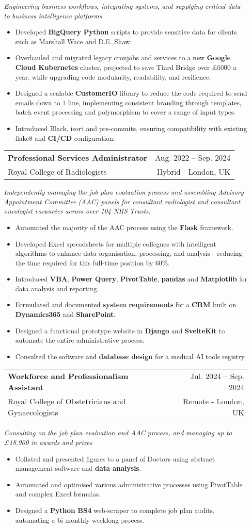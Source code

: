 \documentclass[letterpaper,11pt]{article}
\makeatletter
\newcommand{\resumeItem}[1]{
  \item\small{
    {#1 \vspace{-2pt}}
  }
}
\newcommand{\resumeSubtitle}[1]{
  \vspace{5pt}
  \small{
      \textit{#1 \vspace{-7pt}}
  }
}
\newcommand{\resumeSubheading}[4]{
  \vspace{-2pt}\item
    \begin{tabular*}{0.97\textwidth}[t]{l@{\extracolsep{\fill}}r}
      \textbf{#1} & #2 \\
      {\small#3} & {\small #4} \\
    \end{tabular*}\vspace{-7pt}
}
\newcommand{\resumeItemListStart}{\begin{itemize}}
\newcommand{\resumeItemListEnd}{\end{itemize}\vspace{-5pt}}
\makeatother
\begin{document}
      \resumeSubtitle{Engineering business workflows, integrating systems, and supplying critical data to business intelligence platforms}
      \resumeItemListStart
\resumeItem{Developed \textbf{BigQuery Python} scripts to provide sensitive data for clients such as Marshall Wace and D.E. Shaw.}
\resumeItem{Overhauled and migrated legacy cronjobs and services to a new \textbf{Google Cloud Kubernetes} cluster, projected to save Third Bridge over £6000 a year, while upgrading code modularity, readability, and resilience.}
\resumeItem{Designed a scalable \textbf{CustomerIO} library to reduce the code required to send emails down to 1 line, implementing consistent branding through templates, batch event processing and polymorphism to cover a range of input types.}
\resumeItem{Introduced Black, isort and pre-commits, ensuring compatibility with existing flake8 and \textbf{CI/CD} configuration.}
      \resumeItemListEnd
  
    \resumeSubheading
      {Professional Services Administrator}{Aug. 2022 -- Sep. 2024}
      {Royal College of Radiologists}{Hybrid - London, UK}
      
      \resumeSubtitle{Independently managing the job plan evaluation process and assembling Advisory Appointment Committee (AAC) panels for consultant radiologist and consultant oncologist vacancies across over 104 NHS Trusts.}
      \resumeItemListStart
\resumeItem{Automated the majority of the AAC process using the \textbf{Flask} framework.}
\resumeItem{Developed Excel spreadsheets for multiple collegues with intelligent algorithms to enhance data organisation, processing, and analysis - reducing the time required for this full-time position by 60\%.}
\resumeItem{Introduced \textbf{VBA}, \textbf{Power Query}, \textbf{PivotTable}, \textbf{pandas} and \textbf{Matplotlib} for data analysis and reporting.}
\resumeItem{Formulated and documented \textbf{system requirements} for a \textbf{CRM} built on \textbf{Dynamics365} and \textbf{SharePoint}.}
\resumeItem{Designed a functional prototype website in \textbf{Django} and \textbf{SvelteKit} to automate the entire administrative process.}
\resumeItem{Consulted the software and \textbf{database design} for a medical AI tools registry.}
      \resumeItemListEnd
      

    \resumeSubheading
      {Workforce and Professionalism Assistant}{Jul. 2024 -- Sep. 2024}
      {Royal College of Obstetricians and Gynaecologists}{Remote - London, UK}
      
      \resumeSubtitle{Consulting on the job plan evaluation and AAC process, and managing up to £18,900 in awards and prizes}
      \resumeItemListStart
\resumeItem{Collated and presented figures to a panel of Doctors using abstract management software and \textbf{data analysis}.}
\resumeItem{Automated and optimised various administrative processes using PivotTable and complex Excel formulas.}
\resumeItem{Designed a \textbf{Python BS4} web-scraper to complete job plan audits, automating a bi-monthly weeklong process.}
  \resumeItemListEnd
      
\end{document}
